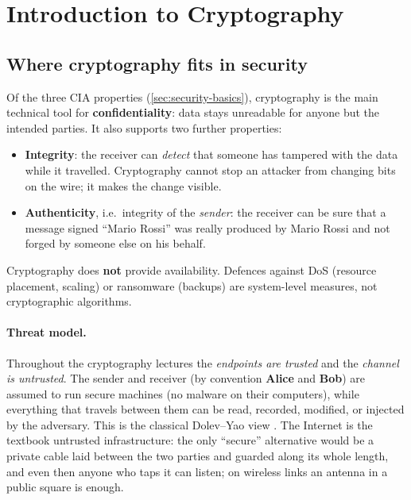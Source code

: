 \section{Introduction to Cryptography}
\label{sec:crypto-intro}

\subsection{Where cryptography fits in security}

Of the three CIA properties (\cref{sec:security-basics}), cryptography is the main technical tool for \textbf{confidentiality}: data stays unreadable for anyone but the intended parties. It also supports two further properties:
\begin{itemize}
    \item \textbf{Integrity}: the receiver can \emph{detect} that someone has tampered with the data while it travelled. Cryptography cannot stop an attacker from changing bits on the wire; it makes the change visible.
    \item \textbf{Authenticity}, i.e.\ integrity of the \emph{sender}: the receiver can be sure that a message signed \enquote{Mario Rossi} was really produced by Mario Rossi and not forged by someone else on his behalf.
\end{itemize}
Cryptography does \textbf{not} provide availability. Defences against DoS (resource placement, scaling) or ransomware (backups) are system-level measures, not cryptographic algorithms.

\paragraph{Threat model.} Throughout the cryptography lectures the \emph{endpoints are trusted} and the \emph{channel is untrusted}. The sender and receiver (by convention \textbf{Alice} and \textbf{Bob}) are assumed to run secure machines (no malware on their computers), while everything that travels between them can be read, recorded, modified, or injected by the adversary. This is the classical Dolev--Yao view \cite{dolev1983}. The Internet is the textbook untrusted infrastructure: the only \enquote{secure} alternative would be a private cable laid between the two parties and guarded along its whole length, and even then anyone who taps it can listen; on wireless links an antenna in a public square is enough.

